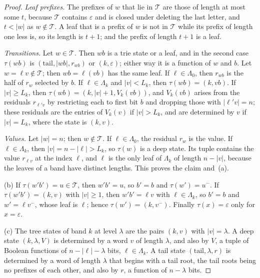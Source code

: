 \documentclass[11pt]{article}
\theoremstyle{remark}
\begin{document}
\begin{proof}
\emph{Leaf prefixes.}  The prefixes of $w$ that lie in $\mathcal T$ are those of length at
most some $t$, because $\mathcal T$ contains $\varepsilon$ and is closed under deleting the
last letter, and $t<|w|$ as $w\notin\mathcal T$.  A leaf that is a prefix of $w$ is not in
$\mathcal T$ while its prefix of length one less is, so its length is $t+1$; and the
prefix of length $t+1$ is a leaf.

\emph{Transitions.}  Let $w\in\mathcal T$.  Then $wb$ is a trie state or a leaf, and in
the second case $\tau(wb)$ is $(\mathrm{tail},|wb|,r_{wb})$ or $(k,\varepsilon)$; either
way it is a function of $w$ and $b$.  Let $w=\ell v\notin\mathcal T$; then $wb=\ell(vb)$
has the same leaf.  If $\ell\in\Lambda_0$, then $r_{wb}$ is the half of $r_w$ selected by
$b$.  If $\ell\in\Lambda_k$ and $|v|<L_k$, then $\tau(wb)=(k,vb)$.  If $|v|\ge L_k$, then
$\tau(wb)=(k,|v|+1,V_k(vb))$, and $V_k(vb)$ arises from the residuals $r_{\ell'v}$ by
restricting each to first bit $b$ and dropping those with $|\ell'v|=n$; these residuals
are the entries of $V_k(v)$ if $|v|>L_k$, and are determined by $v$ if $|v|=L_k$, where
the state is $(k,v)$.

\emph{Values.}  Let $|w|=n$; then $w\notin\mathcal T$.  If $\ell\in\Lambda_0$, the
residual $r_w$ is the value.  If $\ell\in\Lambda_k$, then $|v|=n-|\ell|>L_k$, so $\tau(w)$
is a deep state.  Its tuple contains the value $r_{\ell v}$ at the index $\ell$, and $\ell$
is the only leaf of $\Lambda_k$ of length $n-|v|$, because the leaves of a band have
distinct lengths.  This proves the claim and~(a).

(b)  If $\tau(w'b')=u\in\mathcal T$, then $w'b'=u$, so $b'=b$ and $\tau(w')=u^-$.  If
$\tau(w'b')=(k,v)$ with $|v|\ge1$, then $w'b'=\ell v$ with $\ell\in\Lambda_k$, so $b'=b$
and $w'=\ell v^-$, whose leaf is $\ell$; hence $\tau(w')=(k,v^-)$.  Finally
$\tau(x)=\varepsilon$ only for $x=\varepsilon$.

(c)  The tree states of band $k$ at level $\lambda$ are the pairs $(k,v)$ with
$|v|=\lambda$.  A deep state $(k,\lambda,V)$ is determined by a word $v$ of length
$\lambda$, and also by $V$, a tuple of Boolean functions of $n-|\ell|-\lambda$ bits,
$\ell\in\Lambda_k$.  A tail state $(\mathrm{tail},\lambda,r)$ is determined by a word of
length $\lambda$ that begins with a tail root, the tail roots being no prefixes of each
other, and also by $r$, a function of $n-\lambda$ bits.
\end{proof}
\end{document}
